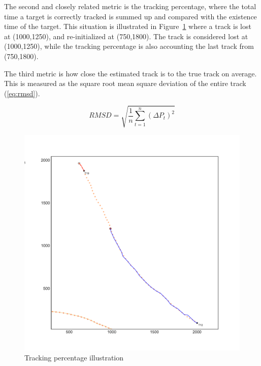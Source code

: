 The second and closely related metric is the tracking percentage, where the total time a target is correctly tracked is summed up and compared with the existence time of the target. This situation is illustrated in Figure~\ref{fig:track_percentage} where a track is lost at (1000,1250), and re-initialized at (750,1800). The track is considered lost at (1000,1250), while the tracking percentage is also accounting the last track from (750,1800). 

The third metric is how close the estimated track is to the true track on average. This is measured as the square root mean square deviation of the entire track (\ref{eq:rmsd}).

\begin{equation}\label{eq:rmsd}
RMSD = \sqrt{\frac{1}{n}\sum_{t=1}^{n}{(\Delta P_t)}^2}
\end{equation}
\begin{figure}
\centering
\includegraphics[width = .8\textwidth]{Figures/track_percentage_illustration.pdf}
\caption{Tracking percentage illustration}\label{fig:track_percentage}
\end{figure}

